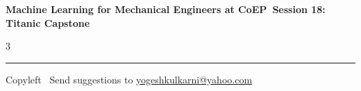 \documentclass[8pt,landscape]{article}
\begin{document}
\footnotesize

\begin{center}
\Large{\textbf{Machine Learning for Mechanical Engineers at CoEP\ Session 18: Titanic Capstone}}
\end{center}

\begin{multicols}{3}

\end{multicols}

\rule{\linewidth}{0.25pt}
\scriptsize
Copyleft \textcopyleft\  Send suggestions to
\href{http://www.yogeshkulkarni.com}{yogeshkulkarni@yahoo.com}
\end{document}
